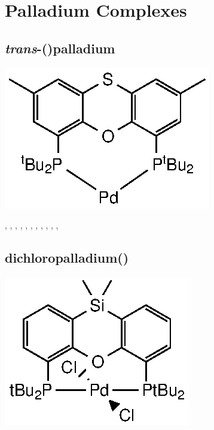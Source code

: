 \section{Palladium Complexes}
\label{section:experimental:palladium}


\subsection*{\emph{trans}-(\tBuThixantphos)palladium}
\begin{structure}[h]
\begin{center}
\includegraphics{../Structures/StBuPd14.eps}
\end{center}
\end{structure}

,
,
,
,
,
,
,
,
,
,
,

\subsection*{dichloropalladium(\tBusixantphos)} 
\begin{structure}[h]
\begin{center}
\includegraphics{../Structures/PdCl2(Si(tBu)2)_complex.eps}
\end{center}
\end{structure}


